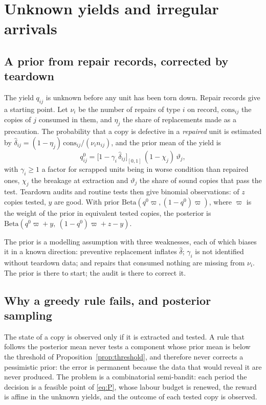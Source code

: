 \section{Unknown yields and irregular arrivals}\label{sec:learning}

\subsection{A prior from repair records, corrected by teardown}

The yield $q_{ij}$ is unknown before any unit has been torn down. Repair records give a starting point. Let $\nu_i$
be the number of repairs of type $i$ on record, $\mathrm{cons}_{ij}$ the copies of $j$ consumed in them, and
$\eta_j$ the share of replacements made as a precaution. The probability that a copy is defective in a
\emph{repaired} unit is estimated by $\hat\delta_{ij}=(1-\eta_j)\,\mathrm{cons}_{ij}/(\nu_in_{ij})$, and the prior
mean of the yield is
\begin{equation}\label{eq:prior}
q^0_{ij}=\big[1-\gamma_i\,\hat\delta_{ij}\big]_{[0,1]}\,(1-\chi_j)\,\vartheta_j,
\end{equation}
with $\gamma_i\ge1$ a factor for scrapped units being in worse condition than repaired ones, $\chi_j$ the breakage
at extraction and $\vartheta_j$ the share of sound copies that pass the test. Teardown audits and routine tests then
give binomial observations: of $z$ copies tested, $y$ are good. With prior
$\mathrm{Beta}(q^0\varpi,(1-q^0)\varpi)$, where $\varpi$ is the weight of the prior in equivalent tested copies, the
posterior is $\mathrm{Beta}(q^0\varpi+y,\ (1-q^0)\varpi+z-y)$.

The prior is a modelling assumption with three weaknesses, each of which biases it in a known direction: preventive
replacement inflates $\hat\delta$; $\gamma_i$ is not identified without teardown data; and repairs that consumed
nothing are missing from $\nu_i$. The prior is there to start; the audit is there to correct it.

\subsection{Why a greedy rule fails, and posterior sampling}

The state of a copy is observed only if it is extracted and tested. A rule that follows the posterior mean never
tests a component whose prior mean is below the threshold of Proposition~\ref{prop:threshold}, and therefore never
corrects a pessimistic prior: the error is permanent because the data that would reveal it are never produced. The
problem is a combinatorial semi-bandit: each period the decision is a feasible point of \eqref{eq:P}, whose labour
budget is renewed, the reward is affine in the unknown yields, and the outcome of each tested copy is observed.

